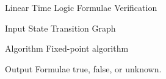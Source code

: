 \begin{frame}{Linear Time Logic Formulae Verification}

\begin{block}{Input}
State Transition Graph
\end{block}

\begin{block}{Algorithm}
Fixed-point algorithm
\end{block}

\begin{block}{Output}
Formulae true, false, or unknown.
\end{block}

\end{frame}
